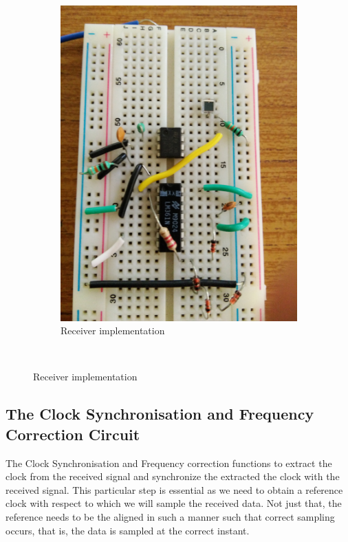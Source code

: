 \documentclass{article}
\begin{document}
\begin{figure}[h]
\begin{subfigure}[t]{0.5\textwidth}
	\centering
	\includegraphics[scale = 0.1]{images/Receiver.jpg}
	\caption{Receiver implementation}
	\label{Fig :1b}
\end{subfigure}
~

\end{figure}


\subsection{The Clock Synchronisation and Frequency Correction Circuit}
The Clock Synchronisation and Frequency correction functions to extract the clock from the received signal and synchronize the extracted the clock with the received signal. This particular step is essential as we need to obtain a reference clock with respect to which  we will sample the received data. Not just that, the reference needs to be the aligned in such a manner such that correct sampling occurs, that is, the data is sampled at the correct instant.
\end{document}
